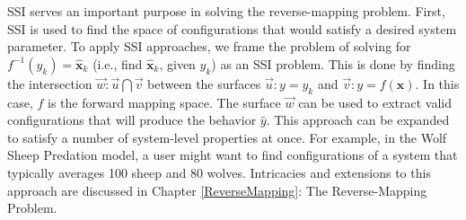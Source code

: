 SSI serves an important purpose in solving the reverse-mapping problem.
First, SSI is used to find the space of configurations that would satisfy a desired system parameter.
To apply SSI approaches, we frame the problem of solving for $f^{-1}(y_k) = \hat{\mathbf x}_k$ (i.e., find $\hat{\mathbf x}_k$, given $y_k$) as an SSI problem.
This is done by finding the intersection $\vec{w} : \vec{u} \bigcap \vec{v}$ between the surfaces $\vec{u}: y = y_k$ and $\vec{v}: y = f(\mathbf x)$.
In this case, $f$ is the forward mapping space.
The surface $\vec{w}$ can be used to extract valid configurations that will produce the behavior $\hat y$.
This approach can be expanded to satisfy a number of system-level properties at once.
For example, in the Wolf Sheep Predation model, a user might want to find configurations of a system that typically averages 100 sheep and 80 wolves.
Intricacies and extensions to this approach are discussed in Chapter \ref{ReverseMapping}: The Reverse-Mapping Problem.













